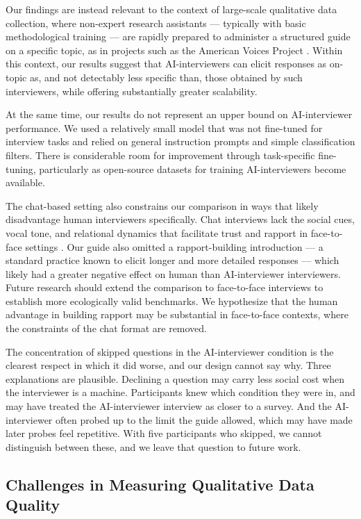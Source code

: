 \documentclass[12pt]{article}
\newcommand{\AII}{AI-interviewer}
\newcommand{\AIIs}{AI-interviewers}
\begin{document}
Our findings are instead relevant to the context of large-scale qualitative data collection, where non-expert research assistants --- typically with basic methodological training --- are rapidly prepared to administer a structured guide on a specific topic, as in projects such as the American Voices Project \citep{EdinFieldsEtAl_2024_Listening_to_Voices_of_America}. Within this context, our results suggest that \AIIs{} can elicit responses as on-topic as, and not detectably less specific than, those obtained by such interviewers, while offering substantially greater scalability.

At the same time, our results do not represent an upper bound on \AII{} performance. We used a relatively small model that was not fine-tuned for interview tasks and relied on general instruction prompts and simple classification filters. There is considerable room for improvement through task-specific fine-tuning, particularly as open-source datasets for training \AIIs{} become available.

The chat-based setting also constrains our comparison in ways that likely disadvantage human interviewers specifically. Chat interviews lack the social cues, vocal tone, and relational dynamics that facilitate trust and rapport in face-to-face settings \citep{dillman_survey_2005}. Our guide also omitted a rapport-building introduction --- a standard practice known to elicit longer and more detailed responses \citep{Gerson2020, Weiss1995} --- which likely had a greater negative effect on human than \AII{} interviewers. Future research should extend the comparison to face-to-face interviews to establish more ecologically valid benchmarks. We hypothesize that the human advantage in building rapport may be substantial in face-to-face contexts, where the constraints of the chat format are removed.

The concentration of skipped questions in the \AII{} condition is the clearest respect in which it did worse, and our design cannot say why. Three explanations are plausible. Declining a question may carry less social cost when the interviewer is a machine. Participants knew which condition they were in, and may have treated the \AII{} interview as closer to a survey. And the \AII{} often probed up to the limit the guide allowed, which may have made later probes feel repetitive. With five participants who skipped, we cannot distinguish between these, and we leave that question to future work.

\subsection*{Challenges in Measuring Qualitative Data Quality}
\end{document}
